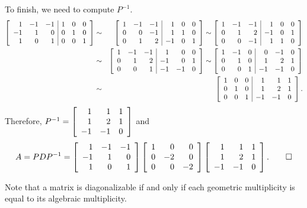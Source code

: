\begin{Exam}
To finish, we need to compute $P^{-1}$. 
\begin{eqnarray*}
\mtx{rrr|rrr}{1&-1&-1&1&0&0\\-1&1&0&0&1&0\\1&0&1&0&0&1} &\sim& \mtx{rrr|rrr}{1&-1&-1&1&0&0\\0&0&-1&1&1&0\\0&1&2&-1&0&1} \sim \mtx{rrr|rrr}{1&-1&-1&1&0&0\\0&1&2&-1&0&1\\0&0&-1&1&1&0}\\
&\sim&  \mtx{rrr|rrr}{1&-1&-1&1&0&0\\0&1&2&-1&0&1\\0&0&1&-1&-1&0} \sim  \mtx{rrr|rrr}{1&-1&0&0&-1&0\\0&1&0&1&2&1\\0&0&1&-1&-1&0}\\
&\sim&  \mtx{rrr|rrr}{1&0&0&1&1&1\\0&1&0&1&2&1\\0&0&1&-1&-1&0}.
\end{eqnarray*} Therefore, $P^{-1} = \mtx{rrr}{1&1&1\\1&2&1\\-1&-1&0}$ and 
\[A = PDP^{-1} = \mtx{rrr}{1&-1&-1\\-1&1&0\\1&0&1}\mtx{rrr}{1&0&0\\0&-2&0\\0&0&-2}\mtx{rrr}{1&1&1\\1&2&1\\-1&-1&0}. \qedhere\]
\end{Exam}\vs

Note that a matrix is diagonalizable if and only if each geometric multiplicity is equal to its algebraic multiplicity.\\


